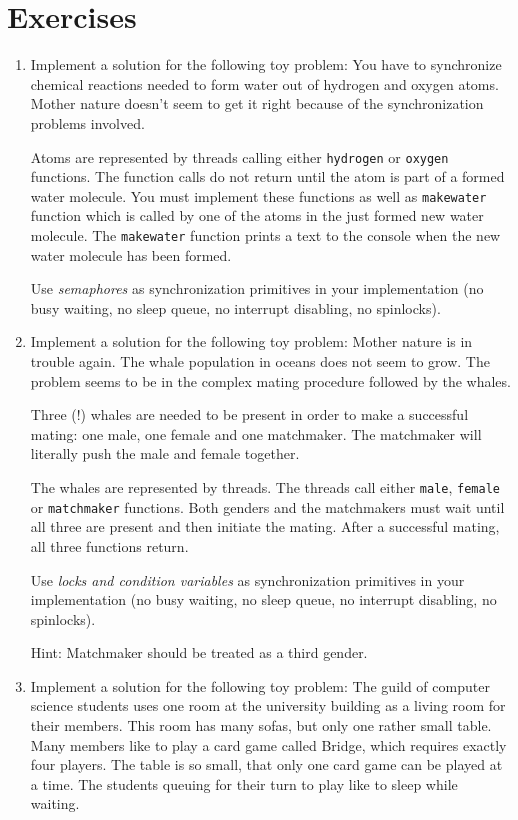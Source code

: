 \documentclass[twoside,a4paper]{report}
\newenvironment{exercises}[1][\addcontentsline{toc}{section}{Exercises}%
\section*{Exercises}\markright{EXERCISES}]{%
#1%
\begin{enumerate}%
}{%
\end{enumerate}
}
\newcounter{exercisec}[chapter]
\newcommand{\cexercise}[1]{%
\item[\stepcounter{exercisec}{\huge\Keyboard}\hspace{5mm}\textbf{\arabic{chapter}.\theexercisec{}.}] #1%
}
\begin{document}
\begin{exercises}
{Test your code by running multiple threads calling
\texttt{buffer\_put} (producers) and multiple threads calling
\texttt{buffer\_get} (consumers).}

\cexercise{Implement a solution for the following toy problem: You have
to synchronize chemical reactions needed to form water out of hydrogen
and oxygen atoms. Mother nature doesn't seem to get it right because
of the synchronization problems involved.

Atoms are represented by threads calling either \texttt{hydrogen} or
\texttt{oxygen} functions. The function calls do not return until the
atom is part of a formed water molecule. You must implement these
functions as well as \texttt{makewater} function which is called by
one of the atoms in the just formed new water molecule. The
\texttt{makewater} function prints a text to the console when the new
water molecule has been formed.

Use \emph{semaphores} as synchronization primitives in your
implementation (no busy waiting, no sleep queue, no interrupt
disabling, no spinlocks).}

\cexercise{Implement a solution for the following toy problem: Mother
nature is in trouble again. The whale population in oceans does not
seem to grow. The problem seems to be in the complex mating procedure
followed by the whales.

Three (!) whales are needed to be present in order to make a
successful mating: one male, one female and one matchmaker. The
matchmaker will literally push the male and female together.

The whales are represented by threads. The threads call either
\texttt{male}, \texttt{female} or \texttt{matchmaker} functions. Both
genders and the matchmakers must wait until all three are present and
then initiate the mating. After a successful mating, all three
functions return.

Use \emph{locks and condition variables} as synchronization primitives
in your implementation (no busy waiting, no sleep queue, no interrupt
disabling, no spinlocks).

Hint: Matchmaker should be treated as a third gender.}

\cexercise{Implement a solution for the following toy problem: The
guild of computer science students uses one room at the university
building as a living room for their members. This room has many sofas,
but only one rather small table. Many members like to play a card game
called Bridge, which requires exactly four players. The table is so
small, that only one card game can be played at a time. The students
queuing for their turn to play like to sleep while waiting.

}
\end{exercises}
\end{document}
